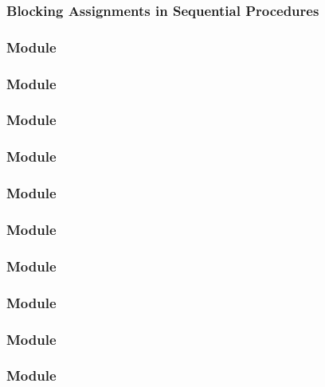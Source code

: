 \documentclass[t, notes, xcolor=table]{beamer}
\begin{document}
\begin{frame}
\frametitle{Blocking Assignments in Sequential Procedures}

\end{frame}

\begin{frame}
\frametitle{Module}

\end{frame}

\begin{frame}
\frametitle{Module}

\end{frame}

\begin{frame}
\frametitle{Module}

\end{frame}

\begin{frame}
\frametitle{Module}

\end{frame}

\begin{frame}
\frametitle{Module}

\end{frame}

\begin{frame}
\frametitle{Module}

\end{frame}

\begin{frame}
\frametitle{Module}

\end{frame}

\begin{frame}
\frametitle{Module}

\end{frame}

\begin{frame}
\frametitle{Module}

\end{frame}

\begin{frame}
\frametitle{Module}

\end{frame}
\end{document}
